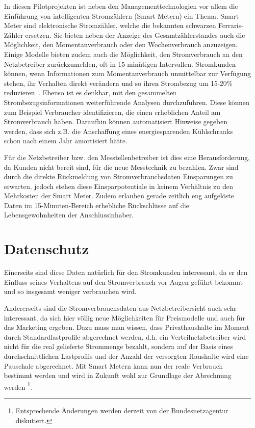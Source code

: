 \documentclass[12pt,BCOR=8.5mm]{scrartcl}
\begin{document}
In diesen Pilotprojekten ist neben den Managementtechnologien vor allem
die Einführung von intelligenten Stromzählern (Smart Metern) ein Thema.
Smart Meter sind elektronische Stromzähler, welche die bekannten
schwarzen Ferraris-Zähler ersetzen. Sie bieten neben der Anzeige des
Gesamtzählerstandes auch die Möglichkeit, den Momentanverbrauch oder den
Wochenverbrauch anzuzeigen. Einige Modelle bieten zudem auch die
Möglichkeit, den Stromverbrauch an den Netzbetreiber zurückzumelden, oft
in 15-minütigen Intervallen. Stromkunden können, wenn
Informationen zum Momentanverbrauch unmittelbar zur Verfügung stehen,
ihr Verhalten direkt verändern und so ihren Strombezug um 15-20\%
reduzieren~\cite{geller2010smartgrid}. Ebenso ist es denkbar, mit den
gesammelten Strombezugsinformationen weiterführende Analysen
durchzuführen. Diese können zum Beispiel Verbraucher identifizieren, die
einen erheblichen Anteil am Stromverbrauch haben. Daraufhin können
automatisiert Hinweise gegeben werden, dass sich z.B. die Anschaffung
eines energiesparenden Kühlschranks schon nach einem Jahr amortisiert
hätte.

Für die Netzbetreiber bzw. den Messtellenbetreiber ist dies eine
Herausforderung, da Kunden nicht bereit sind, für die neue Messtechnik
zu bezahlen. Zwar sind durch die direkte Rückmeldung von
Stromverbrauchsdaten Einsparungen zu erwarten,
jedoch stehen diese Einsparpotentiale in keinem Verhältnis zu
den Mehrkosten der Smart Meter. Zudem erlauben gerade zeitlich eng
aufgelöste Daten im 15-Minuten-Bereich erhebliche Rückschlüsse auf die
Lebensgewohnheiten der Anschlussinhaber.


\section{Datenschutz}\label{sub:datenschutz}
Einerseits sind diese Daten natürlich für den Stromkunden interessant,
da er den Einfluss seines Verhaltens auf den Stromverbrauch vor Augen
geführt bekommt und so insgesamt weniger verbrauchen wird.

Andererseits sind die Stromverbrauchsdaten aus Netzbetreibersicht auch
sehr interessant, da sich hier völlig neue Möglichkeiten für
Preismodelle und auch für das Marketing ergeben. Dazu muss man wissen,
dass Privathaushalte im Moment durch Standardlastprofile abgerechnet
werden, d.h. ein Verteilnetzbetreiber wird nicht für die real gelieferte
Strommenge bezahlt, sondern auf der Basis eines durchschnittlichen
Lastprofils und der Anzahl der versorgten Haushalte wird eine Pauschale
abgerechnet. Mit Smart Metern kann nun der reale Verbrauch bestimmt
werden und wird in Zukunft wohl zur Grundlage der Abrechnung werden
\footnote{Entsprechende Änderungen werden derzeit von der
Bundesnetzagentur diskutiert.}. 
\end{document}
